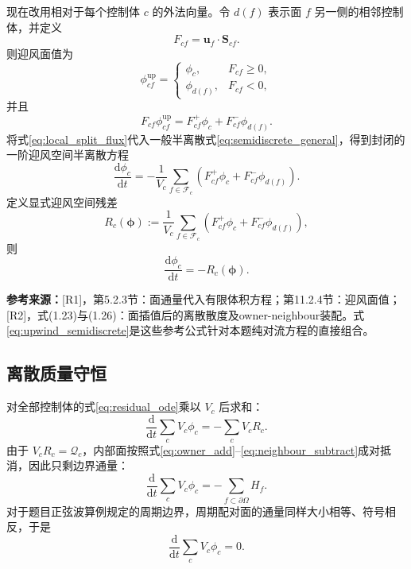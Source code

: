 \documentclass[UTF8,12pt,a4paper]{ctexart}
\numberwithin{equation}{section}
\newcommand{\Rone}{\textnormal{[R1]}}
\newcommand{\Rtwo}{\textnormal{[R2]}}
\newcommand{\source}[1]{%
  \par\smallskip
  \noindent\colorbox{sourcebg}{%
    \parbox{0.955\linewidth}{\footnotesize\color{sourcegray}\textbf{参考来源：}#1}%
  }
  \par\smallskip
}
\newcommand{\phiv}{\bm\phi}
\begin{document}
现在改用相对于每个控制体 $c$ 的外法向量。令 $d(f)$ 表示面 $f$ 另一侧的相邻控制体，并定义
\begin{equation}
  F_{cf}=\bm u_f\cdot\bm S_{cf}.
  \label{eq:local_flux_again}
\end{equation}
则迎风面值为
\begin{equation}
  \phi_{cf}^{\mathrm{up}}=
  \begin{cases}
    \phi_c, & F_{cf}\ge0,\\[1mm]
    \phi_{d(f)}, & F_{cf}<0,
  \end{cases}
  \label{eq:upwind_local}
\end{equation}
并且
\begin{equation}
  F_{cf}\phi_{cf}^{\mathrm{up}}
  =F_{cf}^+\phi_c+F_{cf}^-\phi_{d(f)}.
  \label{eq:local_split_flux}
\end{equation}
将式\eqref{eq:local_split_flux}代入一般半离散式\eqref{eq:semidiscrete_general}，得到封闭的一阶迎风空间半离散方程
\begin{equation}
  \boxed{
  \frac{\mathrm d\phi_c}{\mathrm dt}
  =-\frac{1}{V_c}
  \sum_{f\in\mathcal F_c}
  \left(F_{cf}^+\phi_c+F_{cf}^-\phi_{d(f)}\right)
  }.
  \label{eq:upwind_semidiscrete}
\end{equation}
定义显式迎风空间残差
\begin{equation}
  R_c(\phiv)
  :=\frac{1}{V_c}\sum_{f\in\mathcal F_c}
  \left(F_{cf}^+\phi_c+F_{cf}^-\phi_{d(f)}\right),
  \label{eq:residual}
\end{equation}
则
\begin{equation}
  \boxed{
  \frac{\mathrm d\phi_c}{\mathrm dt}
  =-R_c(\phiv)
  }.
  \label{eq:residual_ode}
\end{equation}

\source{\Rone，第5.2.3节：面通量代入有限体积方程；第11.2.4节：迎风面值；\Rtwo，式(1.23)与(1.26)：面插值后的离散散度及owner-neighbour装配。式\eqref{eq:upwind_semidiscrete}是这些参考公式针对本题纯对流方程的直接组合。}

\subsection{离散质量守恒}

对全部控制体的式\eqref{eq:residual_ode}乘以 $V_c$ 后求和：
\begin{equation}
  \frac{\mathrm d}{\mathrm dt}\sum_cV_c\phi_c
  =-\sum_cV_cR_c.
  \label{eq:global_mass1}
\end{equation}
由于 $V_cR_c=\mathcal Q_c$，内部面按照式\eqref{eq:owner_add}--\eqref{eq:neighbour_subtract}成对抵消，因此只剩边界通量：
\begin{equation}
  \frac{\mathrm d}{\mathrm dt}\sum_cV_c\phi_c
  =-\sum_{f\subset\partial\Omega}H_f.
  \label{eq:global_mass2}
\end{equation}
对于题目正弦波算例规定的周期边界，周期配对面的通量同样大小相等、符号相反，于是
\begin{equation}
  \boxed{
  \frac{\mathrm d}{\mathrm dt}\sum_cV_c\phi_c=0
  }.
  \label{eq:mass_conservation}
\end{equation}
\end{document}
